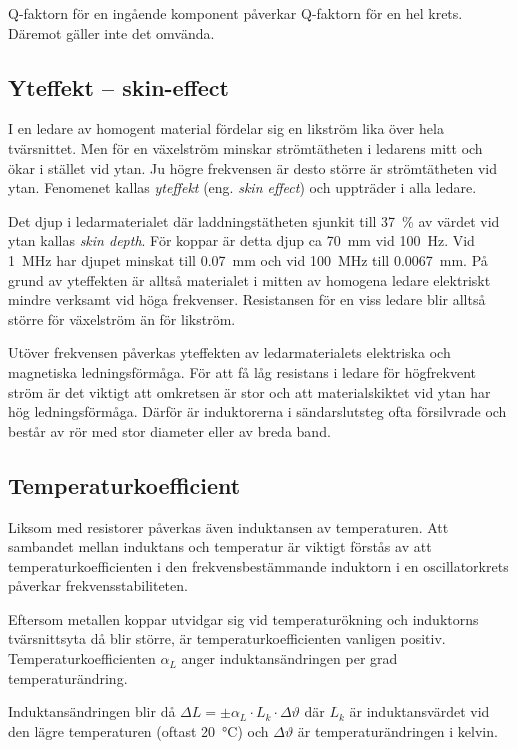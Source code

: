 Q-faktorn för en ingående komponent påverkar Q-faktorn för en hel krets.
Däremot gäller inte det omvända.

\subsection{Yteffekt -- skin-effect}

I en ledare av homogent material fördelar sig en likström lika över hela
tvärsnittet. Men för en växelström minskar strömtätheten i ledarens mitt
och ökar i stället vid ytan.
Ju högre frekvensen är desto större är strömtätheten vid ytan.
Fenomenet kallas \emph{yteffekt} (eng. \emph{skin effect}) och uppträder i alla
ledare.

Det djup i ledarmaterialet där laddningstätheten sjunkit till \SI{37}{\percent}
av värdet vid ytan kallas \emph{skin depth}.
För koppar är detta djup ca \SI{70}{\milli\metre} vid \SI{100}{\hertz}.
Vid \SI{1}{\mega\hertz} har djupet minskat till \SI{0,07}{\milli\metre} och vid
\SI{100}{\mega\hertz} till \SI{0,0067}{\milli\metre}.
På grund av yteffekten är alltså materialet i mitten av homogena
ledare elektriskt mindre verksamt vid höga frekvenser. Resistansen för en viss ledare 
blir alltså större för växelström än för likström.

Utöver frekvensen påverkas yteffekten av ledarmaterialets elektriska och
magnetiska ledningsförmåga. För att få låg resistans i ledare för högfrekvent
ström är det viktigt att omkretsen är stor och att materialskiktet vid ytan har
hög ledningsförmåga. Därför är induktorerna i sändarslutsteg ofta 
försilvrade och består av rör med stor diameter eller av breda band.

\subsection{Temperaturkoefficient}

Liksom med resistorer påverkas även induktansen av temperaturen. Att sambandet
mellan induktans och temperatur är viktigt förstås av att
temperaturkoefficienten i den frekvensbestämmande induktorn i en oscillatorkrets
påverkar frekvensstabiliteten.

Eftersom metallen koppar utvidgar sig vid temperaturökning och induktorns
tvärsnittsyta då blir större, är temperaturkoefficienten vanligen positiv.
Temperaturkoefficienten \(\alpha_L\) anger induktansändringen per grad
temperaturändring.

Induktansändringen blir då $\Delta L = \pm \alpha _L \cdot L_k \cdot \Delta\vartheta$
där \(L_k\) är induktansvärdet vid den lägre temperaturen (oftast
\SI{20}{\degreeCelsius}) och \(\Delta\vartheta\) är temperaturändringen i
kelvin.

